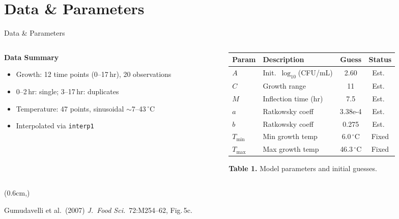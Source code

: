 \documentclass[10pt,aspectratio=169]{beamer}
\newcommand{\citefoot}[1]{%
  \begin{textblock*}{\dimexpr\paperwidth-1.2cm}(0.6cm,\dimexpr\paperheight-0.65cm)
  {\tiny\color{gray}\raggedright #1}
  \end{textblock*}
}
\begin{document}
\section{Data \& Parameters}
\begin{frame}{Data \& Parameters}
\begin{columns}[T]
\begin{column}{0.45\textwidth}
\textbf{Data Summary}
\begin{itemize}
    \item Growth: 12 time points (0--17\,hr), 20 observations
    \item 0--2\,hr: single; 3--17\,hr: duplicates
    \item Temperature: 47 points, sinusoidal $\sim$7--43\,$^\circ$C
    \item Interpolated via \texttt{interp1}
\end{itemize}
\end{column}
\begin{column}{0.52\textwidth}
\centering
{\small
\begin{tabular}{llcc}
\toprule
Param & Description & Guess & Status \\
\midrule
$A$        & Init.\ $\log_{10}$(CFU/mL) & 2.60     & Est.\ \\
$C$        & Growth range               & 11       & Est.\ \\
$M$        & Inflection time (hr)       & 7.5      & Est.\ \\
$a$        & Ratkowsky coeff            & 3.38e-4  & Est.\ \\
$b$        & Ratkowsky coeff            & 0.275    & Est.\ \\
$T_{\min}$ & Min growth temp            & 6.0\,$^\circ$C  & Fixed \\
$T_{\max}$ & Max growth temp            & 46.3\,$^\circ$C & Fixed \\
\bottomrule
\end{tabular}}

\vspace{0.3em}
{\footnotesize\textbf{Table 1.} Model parameters and initial guesses.}
\end{column}
\end{columns}
\citefoot{Gumudavelli et al.\ (2007) \textit{J.\ Food Sci.}\ 72:M254--62, Fig.\,5c.}
\end{frame}

\end{document}
